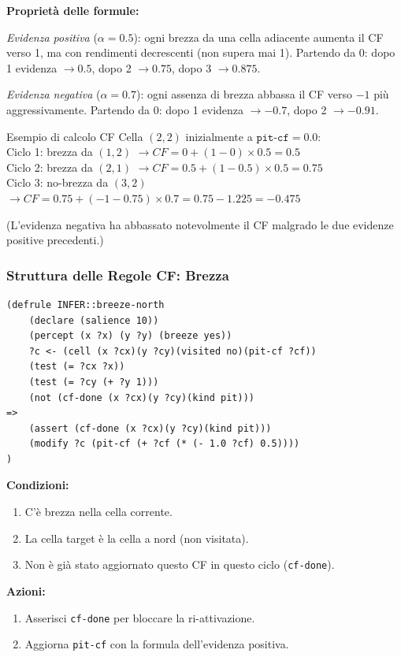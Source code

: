 \documentclass[12pt,a4paper]{article}
\begin{document}
\textbf{Proprietà delle formule:}

\emph{Evidenza positiva} ($\alpha = 0.5$): ogni brezza da una cella adiacente
aumenta il CF verso 1, ma con rendimenti decrescenti (non supera mai 1).
Partendo da 0: dopo 1 evidenza $\to 0.5$, dopo 2 $\to 0.75$, dopo 3 $\to 0.875$.

\emph{Evidenza negativa} ($\alpha = 0.7$): ogni assenza di brezza abbassa il CF
verso $-1$ più aggressivamente. Partendo da 0: dopo 1 evidenza $\to -0.7$,
dopo 2 $\to -0.91$.

\begin{exbox}{Esempio di calcolo CF}
Cella $(2,2)$ inizialmente a $\texttt{pit-cf} = 0.0$:\\
Ciclo 1: brezza da $(1,2)$ $\to CF = 0 + (1-0)\times 0.5 = 0.5$\\
Ciclo 2: brezza da $(2,1)$ $\to CF = 0.5 + (1-0.5)\times 0.5 = 0.75$\\
Ciclo 3: no-brezza da $(3,2)$ $\to CF = 0.75 + (-1-0.75)\times 0.7 = 0.75 - 1.225 = -0.475$

(L'evidenza negativa ha abbassato notevolmente il CF malgrado le due evidenze
positive precedenti.)
\end{exbox}

\subsubsection{Struttura delle Regole CF: Brezza}

\begin{lstlisting}
(defrule INFER::breeze-north
    (declare (salience 10))
    (percept (x ?x) (y ?y) (breeze yes))
    ?c <- (cell (x ?cx)(y ?cy)(visited no)(pit-cf ?cf))
    (test (= ?cx ?x))
    (test (= ?cy (+ ?y 1)))
    (not (cf-done (x ?cx)(y ?cy)(kind pit)))
=>
    (assert (cf-done (x ?cx)(y ?cy)(kind pit)))
    (modify ?c (pit-cf (+ ?cf (* (- 1.0 ?cf) 0.5))))
)
\end{lstlisting}

\textbf{Condizioni:}
\begin{enumerate}[noitemsep]
  \item C'è brezza nella cella corrente.
  \item La cella target è la cella a nord (non visitata).
  \item Non è già stato aggiornato questo CF in questo ciclo (\texttt{cf-done}).
\end{enumerate}

\textbf{Azioni:}
\begin{enumerate}[noitemsep]
  \item Asserisci \texttt{cf-done} per bloccare la ri-attivazione.
  \item Aggiorna \texttt{pit-cf} con la formula dell'evidenza positiva.
\end{enumerate}
\end{document}
